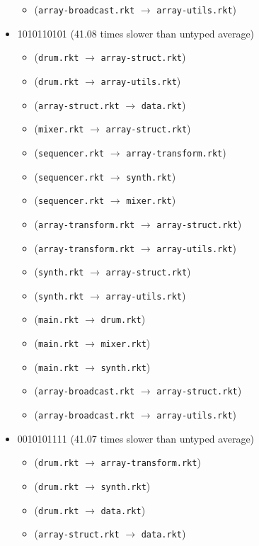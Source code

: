 \documentclass{article}
\newcommand{\mono}[1]{\texttt{#1}}
\begin{document}
\begin{itemize}
\begin{itemize}
  \item (\mono{array-broadcast.rkt} $\rightarrow$ \mono{array-utils.rkt})
  \end{itemize}
\item 1010110101 (41.08 times slower than untyped average)
  \begin{itemize}
  \item (\mono{drum.rkt} $\rightarrow$ \mono{array-struct.rkt})
  \item (\mono{drum.rkt} $\rightarrow$ \mono{array-utils.rkt})
  \item (\mono{array-struct.rkt} $\rightarrow$ \mono{data.rkt})
  \item (\mono{mixer.rkt} $\rightarrow$ \mono{array-struct.rkt})
  \item (\mono{sequencer.rkt} $\rightarrow$ \mono{array-transform.rkt})
  \item (\mono{sequencer.rkt} $\rightarrow$ \mono{synth.rkt})
  \item (\mono{sequencer.rkt} $\rightarrow$ \mono{mixer.rkt})
  \item (\mono{array-transform.rkt} $\rightarrow$ \mono{array-struct.rkt})
  \item (\mono{array-transform.rkt} $\rightarrow$ \mono{array-utils.rkt})
  \item (\mono{synth.rkt} $\rightarrow$ \mono{array-struct.rkt})
  \item (\mono{synth.rkt} $\rightarrow$ \mono{array-utils.rkt})
  \item (\mono{main.rkt} $\rightarrow$ \mono{drum.rkt})
  \item (\mono{main.rkt} $\rightarrow$ \mono{mixer.rkt})
  \item (\mono{main.rkt} $\rightarrow$ \mono{synth.rkt})
  \item (\mono{array-broadcast.rkt} $\rightarrow$ \mono{array-struct.rkt})
  \item (\mono{array-broadcast.rkt} $\rightarrow$ \mono{array-utils.rkt})
  \end{itemize}
\item 0010101111 (41.07 times slower than untyped average)
  \begin{itemize}
  \item (\mono{drum.rkt} $\rightarrow$ \mono{array-transform.rkt})
  \item (\mono{drum.rkt} $\rightarrow$ \mono{synth.rkt})
  \item (\mono{drum.rkt} $\rightarrow$ \mono{data.rkt})
  \item (\mono{array-struct.rkt} $\rightarrow$ \mono{data.rkt})

\end{itemize}
\end{itemize}
\end{document}
